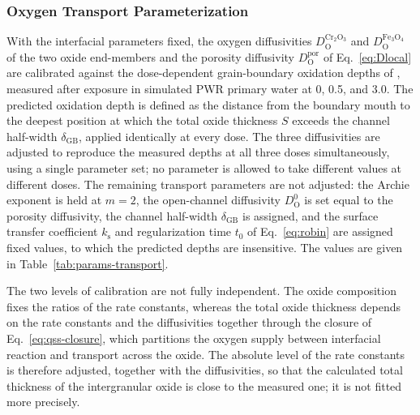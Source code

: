 \documentclass[3p,times]{elsarticle} %
\newcommand{\textcite}[1]{\citet{#1}}
\newcommand{\GB}{\mathrm{GB}}
\newcommand{\Ox}{\mathrm{O}}           %
\begin{document}
\subsubsection{Oxygen Transport Parameterization}
\label{sec:methodTransportCalibration}
With the interfacial parameters fixed, the oxygen diffusivities
\(D_{\Ox}^{\mathrm{Cr_2O_3}}\) and \(D_{\Ox}^{\mathrm{Fe_3O_4}}\) of the two
oxide end-members and the porosity diffusivity \(D_{\Ox}^{\mathrm{por}}\) of
Eq.~\eqref{eq:Dlocal} are calibrated against the dose-dependent
grain-boundary oxidation depths of \textcite{deng2017effect}, measured after
exposure in simulated PWR primary water at 0, 0.5, and \SI{3.0}{\dpa}. The
predicted oxidation depth is defined as the distance from the boundary mouth
to the deepest position at which the total oxide thickness \(S\) exceeds the
channel half-width \(\delta_{\GB}\), applied identically at every dose. The
three diffusivities are adjusted to reproduce the measured depths at all
three doses simultaneously, using a single parameter set; no parameter is
allowed to take different values at different doses. The remaining transport
parameters are not adjusted: the Archie exponent is held at \(m=2\), the
open-channel diffusivity \(D_{\Ox}^{0}\) is set equal to the porosity
diffusivity, the channel half-width \(\delta_{\GB}\) is assigned, and the
surface transfer coefficient \(k_{\mathrm{s}}\) and regularization time
\(t_0\) of Eq.~\eqref{eq:robin} are assigned fixed values, to which the
predicted depths are insensitive. The values are given in
Table~\ref{tab:params-transport}.

The two levels of calibration are not fully independent. The oxide composition
fixes the ratios of the rate constants, whereas the total oxide thickness
depends on the rate constants and the diffusivities together through the
closure of Eq.~\eqref{eq:qss-closure}, which partitions the oxygen supply
between interfacial reaction and transport across the oxide. The absolute
level of the rate constants is therefore adjusted, together with the
diffusivities, so that the calculated total thickness of the intergranular
oxide is close to the measured one; it is not fitted more precisely.
\end{document}
